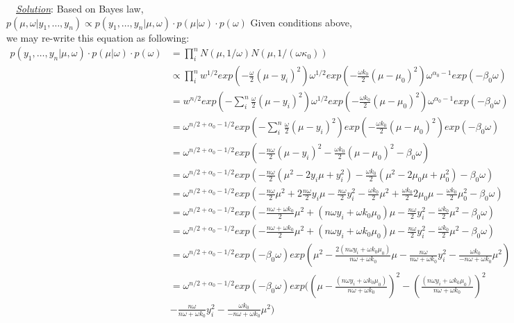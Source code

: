 \documentclass[twoside]{article}
\newenvironment{solution}{
  \begin{flushleft} \noindent ~~\underline{\emph{Solution}}: \rmfamily}{\end{flushleft}}
\begin{document}
\begin{solution}
Based on Bayes law, $p(\mu, \omega | y_1,\dots, y_n) \propto p(y_1, \dots, y_n |\mu, \omega) \cdot p(\mu|\omega) \cdot p(\omega)$ Given conditions above, we may re-write this equation as following:
\begin{equation}
\begin{split}
p(y_1, \dots, y_n |\mu, \omega) \cdot p(\mu|\omega) \cdot p(\omega) &= \prod_i^n N(\mu, 1/\omega) N(\mu, 1/(\omega \kappa_0)) 
\\ &\propto \prod_i^nw^{1/2}exp(-\frac{\omega}{2}(\mu-y_i)^2) \omega^{1/2}exp(-\frac{\omega k_0}{2}(\mu-\mu_0)^2) \omega^{\alpha_0-1}exp(-\beta_0\omega) 
\\ &= w^{n/2}exp(-\sum_i^n\frac{\omega}{2}(\mu-y_i)^2) \omega^{1/2} exp(-\frac{\omega k_0}{2}(\mu-\mu_0)^2) \omega^{\alpha_0-1}exp(-\beta_0\omega) 
\\ &= \omega^{n/2+\alpha_{0}-1/2} exp(-\sum_i^n\frac{\omega}{2}(\mu-y_i)^2) exp(-\frac{\omega k_0}{2}(\mu-\mu_0)^2) exp(-\beta_0\omega)  
\\ &= \omega^{n/2+\alpha_{0}-1/2} exp(-\frac{n\omega}{2}(\mu-y_i)^2 -\frac{\omega k_0}{2}(\mu-\mu_0)^2 -\beta_0\omega)  
\\ &= \omega^{n/2+\alpha_{0}-1/2} exp(-\frac{n\omega}{2}(\mu^2-2y_i\mu+y_i^2) -\frac{\omega k_0}{2}(\mu^2-2\mu_0\mu+\mu_0^2) -\beta_0\omega) 
\\ &= \omega^{n/2+\alpha_{0}-1/2} exp(-\frac{n\omega}{2}\mu^2+2\frac{n\omega}{2}y_i\mu-\frac{n\omega}{2}y_i^2 -\frac{\omega k_0}{2}\mu^2+\frac{\omega k_0}{2}2\mu_0\mu-\frac{\omega k_0}{2}\mu_0^2 -\beta_0\omega)  
\\ &= \omega^{n/2+\alpha_{0}-1/2} exp(-\frac{n\omega+\omega k_0}{2}\mu^2+({n\omega}y_i+{\omega k_0}\mu_0)\mu-\frac{n\omega}{2}y_i^2 -\frac{\omega k_0}{2}\mu^2 -\beta_0\omega)  
\\ &= \omega^{n/2+\alpha_{0}-1/2} exp(-\frac{n\omega+\omega k_0}{2}\mu^2+({n\omega}y_i+{\omega k_0}\mu_0)\mu-\frac{n\omega}{2}y_i^2 -\frac{\omega k_0}{2}\mu^2 -\beta_0\omega)  
\\ &= \omega^{n/2+\alpha_{0}-1/2} exp(-\beta_0\omega) exp(\mu^2-\frac{2({n\omega}y_i+{\omega k_0}\mu_0)}{n\omega+\omega k_0}\mu-\frac{n\omega}{n\omega+\omega k_0}y_i^2 -\frac{\omega k_0}{-{n\omega+\omega k_0}}\mu^2 ) 
\\ &= \omega^{n/2+\alpha_{0}-1/2} exp(-\beta_0\omega) exp((\mu -\frac{({n\omega}y_i+{\omega k_0}\mu_0)}{n\omega+\omega k_0})^2 -(\frac{({n\omega}y_i+{\omega k_0}\mu_0)}{n\omega+\omega k_0})^2 \\ &-\frac{n\omega}{n\omega+\omega k_0}y_i^2 -\frac{\omega k_0}{-{n\omega+\omega k_0}}\mu^2 ) 

\end{split}
\end{equation}
\end{solution}
\end{document}
